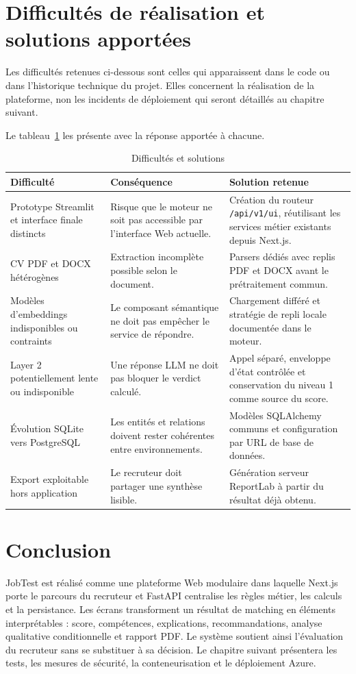 \section{Difficultés de réalisation et solutions apportées}

Les difficultés retenues ci-dessous sont celles qui apparaissent dans le code ou dans l'historique technique du projet. Elles concernent la réalisation de la plateforme, non les incidents de déploiement qui seront détaillés au chapitre suivant.

Le tableau~\ref{tab:chap5-difficulties} les présente avec la réponse apportée à chacune.

\begin{table}[H]
\centering
\small
\caption{Difficultés et solutions}
\label{tab:chap5-difficulties}
\begin{tabularx}{\textwidth}{|p{}|p{}|X|}
\hline
\textbf{Difficulté} & \textbf{Conséquence} & \textbf{Solution retenue}\\
\hline
Prototype Streamlit et interface finale distincts & Risque que le moteur ne soit pas accessible par l'interface Web actuelle. & Création du routeur \texttt{/api/v1/ui}, réutilisant les services métier existants depuis Next.js.\\
\hline
CV PDF et DOCX hétérogènes & Extraction incomplète possible selon le document. & Parsers dédiés avec replis PDF et DOCX avant le prétraitement commun.\\
\hline
Modèles d'embeddings indisponibles ou contraints & Le composant sémantique ne doit pas empêcher le service de répondre. & Chargement différé et stratégie de repli locale documentée dans le moteur.\\
\hline
Layer 2 potentiellement lente ou indisponible & Une réponse LLM ne doit pas bloquer le verdict calculé. & Appel séparé, enveloppe d'état contrôlée et conservation du niveau 1 comme source du score.\\
\hline
Évolution SQLite vers PostgreSQL & Les entités et relations doivent rester cohérentes entre environnements. & Modèles SQLAlchemy communs et configuration par URL de base de données.\\
\hline
Export exploitable hors application & Le recruteur doit partager une synthèse lisible. & Génération serveur ReportLab à partir du résultat déjà obtenu.\\
\hline
\end{tabularx}
\end{table}

\section*{Conclusion}

JobTest est réalisé comme une plateforme Web modulaire dans laquelle Next.js porte le parcours du recruteur et FastAPI centralise les règles métier, les calculs et la persistance. Les écrans transforment un résultat de matching en éléments interprétables : score, compétences, explications, recommandations, analyse qualitative conditionnelle et rapport PDF. Le système soutient ainsi l'évaluation du recruteur sans se substituer à sa décision. Le chapitre suivant présentera les tests, les mesures de sécurité, la conteneurisation et le déploiement Azure.
